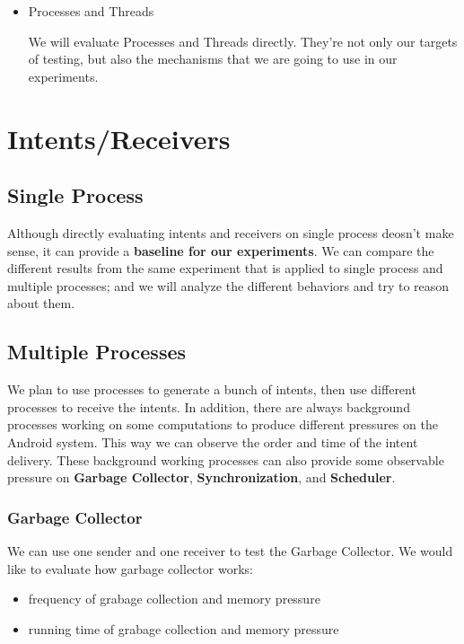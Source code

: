 \documentclass[11pt]{article}
\begin{document}
\begin{itemize}
\item Processes and Threads

We will evaluate Processes and Threads directly.
They're not only our targets of testing, but also the mechanisms that we are going to use in our experiments.
\end{itemize}

\section{Intents/Receivers}
\label{sec-3}
\subsection{Single Process}
\label{sec-3-1}
Although directly evaluating intents and receivers on
single process deosn't make sense,
it can provide a \textbf{baseline for our experiments}.
We can compare the different results from the same experiment that is applied to single process
and multiple processes;
and we will analyze the different behaviors and try to reason about them.

\subsection{Multiple Processes}
\label{sec-3-2}
We plan to use processes to generate a bunch of intents, then use different
processes to receive the intents.
In addition, there are always background processes working on some computations
to produce different pressures on the Android system.
This way we can observe the order and time of the intent delivery.
These background working processes can also provide some observable pressure on \textbf{Garbage Collector}, \textbf{Synchronization}, and \textbf{Scheduler}.

\subsubsection{Garbage Collector}
\label{sec-3-2-1}
We can use one sender and one receiver to test the Garbage Collector.
We would like to evaluate how garbage collector works:
\begin{itemize}
\item frequency of grabage collection and memory pressure
\item running time of grabage collection and memory pressure
\end{itemize}
\end{document}
